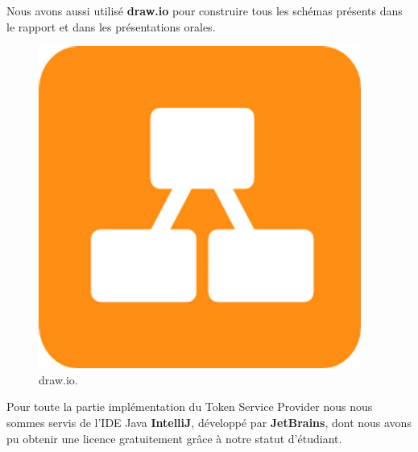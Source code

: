 \documentclass{report}
\begin{document}
\newpage
\noindent
Nous avons aussi utilisé \textbf{draw.io} pour construire tous les schémas présents dans le rapport et dans les présentations orales.

\begin{figure}[!ht]
    \centering
			\includegraphics[scale=0.2]{img/draw.png}
			\caption{\label{Draw} draw.io.}			
\end{figure}

\noindent
Pour toute la partie implémentation du Token Service Provider nous nous sommes servis de l'IDE Java \textbf{IntelliJ}, développé par \textbf{JetBrains}, dont nous avons pu obtenir une licence gratuitement grâce à notre statut d'étudiant.
\end{document}

